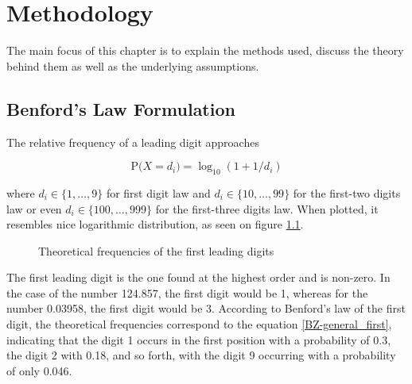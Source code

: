 \chapter{Methodology}

The main focus of this chapter is to explain the methods used, discuss the theory behind them as well as the underlying assumptions. 

\section{Benford's Law Formulation}

The relative frequency of a leading digit approaches 

\begin{equation}
    \label{BZ-general_first}
\text{P(} X = d_i\text{)}= \log_{10}(1+1/d_i)
\end{equation}

where $d_i \in \{1,\dots,9\}$ for first digit law and $d_i \in \{10,\dots,99\}$ for the first-two digits law or even $d_i \in \{100,\dots,999\}$ for the first-three digits law. When plotted, it resembles nice logarithmic distribution, as seen on figure \ref{fig:FL}.  \cite{Cerqueti2202,Hronova2023,Newcomb1881}

\begin{figure}[h]
    \centering
    \caption{Theoretical frequencies of the first leading digits}
    \label{fig:FL}
    \pgfplotsset{width=8.5cm,compat=1.18}
\end{figure}

The first leading digit is the one found at the highest order and is non-zero. In the case of the number 124.857, the first digit would be 1, whereas for the number 0.03958, the first digit would be 3. According to Benford's law of the first digit, the theoretical frequencies correspond to the equation \ref{BZ-general_first}, indicating that the digit 1 occurs in the first position with a probability of 0.3, the digit 2 with 0.18, and so forth, with the digit 9 occurring with a probability of only 0.046.

